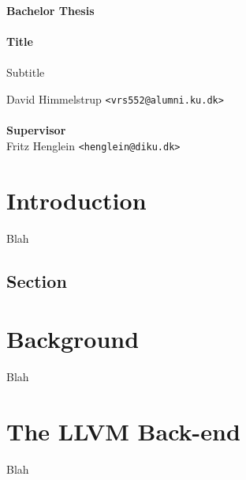 \documentclass[a4paper,oneside]{memoir}
\begin{document}
    \thispagestyle{empty}
    \begin{adjustwidth}{-3cm}{-1.5cm}
    \vspace*{-1cm}
    \textbf{\Huge Bachelor Thesis} \\
    \vspace*{2.5cm} \\
    \textbf{\Huge Title} \\
    \vspace*{.1cm} \\
    {\huge Subtitle} \\
    \begin{tabbing}
    David Himmelstrup \hspace{1cm} \= \texttt{<vrs552@alumni.ku.dk>} \\
    \\[12cm]
    \textbf{\Large Supervisor} \\
    Fritz Henglein \> \texttt{<henglein@diku.dk>} \\
    \end{tabbing}
    \end{adjustwidth}
    \newpage
    \ClearWallPaper

\tableofcontents*

\chapter{Introduction}
Blah
\section{Section}

\chapter{Background}
Blah

\chapter{The LLVM Back-end}
Blah
\end{document}

